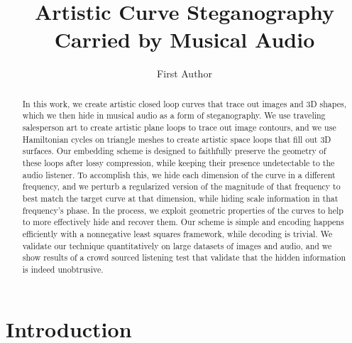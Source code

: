 \documentclass[runningheads]{llncs}
\begin{document}
%
\title{Artistic Curve Steganography Carried by Musical Audio}
%
%
\author{First Author}
%
%
%
\maketitle              %
%
\begin{abstract}

  In this work, we create artistic closed loop curves that trace out images and 3D shapes, which we then hide in musical audio as a form of steganography.  We use traveling salesperson art to create artistic plane loops to trace out image contours, and we use Hamiltonian cycles on triangle meshes to create artistic space loops that fill out 3D surfaces. Our embedding scheme is designed to faithfully preserve the geometry of these loops after lossy compression, while keeping their presence undetectable to the audio listener. To accomplish this, we hide each dimension of the curve in a different frequency, and we perturb a regularized version of the magnitude of that frequency to best match the target curve at that dimension, while hiding scale information in that frequency's phase.  In the process, we exploit geometric properties of the curves to help to more effectively hide and recover them.  Our scheme is simple and encoding happens efficiently with a nonnegative least squares framework, while decoding is trivial.  We validate our technique quantitatively on large datasets of images and audio, and we show results of a crowd sourced listening test that validate that the hidden information is indeed unobtrusive.



  

\end{abstract}
%
%
%
\section{Introduction}
\end{document}
